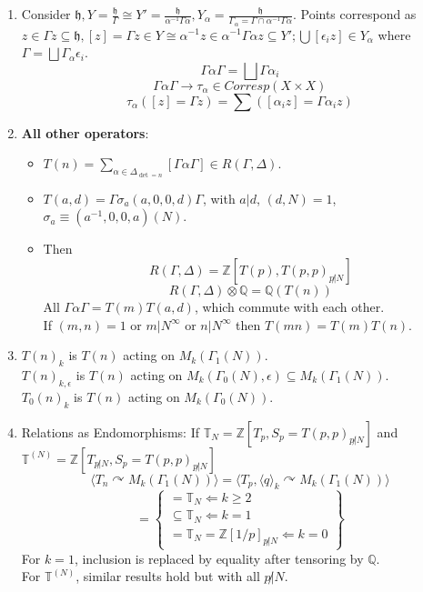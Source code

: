 \documentclass{article}
\newcommand{\Q}{\mathbb{Q}}
\newcommand{\Z}{\mathbb{Z}}
\newcommand{\hh}{\mathfrak{h}}
\newcommand{\ra}{\rightarrow}
\newcommand{\La}{\Leftarrow}
\begin{document}
\begin{multicols}{2}
\begin{enumerate}
\item Consider $\hh, Y = \frac{\hh}{\Gamma} \cong Y' = \frac{\hh}{\alpha^{-1}\Gamma \alpha}, Y_\alpha = \frac{\hh}{\Gamma_\alpha = \Gamma \cap \alpha^{-1} \Gamma \alpha}$. Points correspond as $z \in \Gamma z \subseteq \hh, [z] = \Gamma z \in Y \cong \alpha^{-1}z \in \alpha^{-1}\Gamma \alpha z  \subseteq Y'; \bigcup [\epsilon_i z] \in Y_\alpha$ where $\Gamma = \bigsqcup \Gamma_\alpha \epsilon_i$.
\[\Gamma \alpha \Gamma = \bigsqcup \Gamma \alpha_i\]
\[\Gamma \alpha \Gamma \ra \tau_\alpha \in Corresp(X \times X)\]
\[\tau_\alpha([z] = \Gamma z) = \sum \left([\alpha_i z] = \Gamma \alpha_i z\right)\]


\item \textbf{All other operators}: 
\begin{itemize}
\item $T(n) = \sum_{\alpha \in \Delta_{\det = n}} [\Gamma \alpha \Gamma] \in R(\Gamma,\Delta)$. 
\item $T(a,d) = \Gamma \sigma_a(a,0,0,d)\Gamma$, with $a|d$, $(d,N) = 1$, $\sigma_a \equiv (a^{-1},0,0,a)(N)$. 
\item Then 
\[R(\Gamma,\Delta) = \Z[T(p),T(p,p)_{p\not|N}]\]
\[R(\Gamma,\Delta) \otimes \Q = \Q(T(n))\]
All $\Gamma \alpha \Gamma = T(m)T(a,d)$, which commute with each other.\\
If $(m,n) = 1$ or $m|N^\infty$ or $n|N^\infty$ then $T(mn) = T(m)T(n)$. 
\end{itemize}

\item $T(n)_k$ is $T(n)$ acting on $M_k(\Gamma_1(N))$.\\
$T(n)_{k,\epsilon}$ is $T(n)$ acting on $M_k(\Gamma_0(N),\epsilon) \subseteq M_k(\Gamma_1(N))$.\\
$T_0(n)_k$ is $T(n)$ acting on $M_k(\Gamma_0(N))$.

\item Relations as Endomorphisms: If $\mathbb{T}_N = \Z[T_p, S_p = T(p,p)_{p \not|N}]$ and $\mathbb{T}^{(N)} = \Z[T_{p\not|N}, S_p = T(p,p)_{p \not|N}]$
\[\langle T_n \curvearrowright M_k(\Gamma_1(N))\rangle = \langle T_p, \langle q \rangle_k \curvearrowright M_k(\Gamma_1(N))\rangle\]
\[= \left\{\begin{array}{cc} = \mathbb{T}_N \La k \geq 2 \\ \subseteq \mathbb{T}_N \La k = 1 \\
= \mathbb{T}_N = \Z[1/p]_{p\not|N} \La k = 0\end{array}\right\}\]
For $k = 1$, inclusion is replaced by equality after tensoring by $\Q$.\\
For $\mathbb{T}^{(N)}$, similar results hold but with all $p\not|N$. 


\end{enumerate}
\end{multicols}
\end{document}

